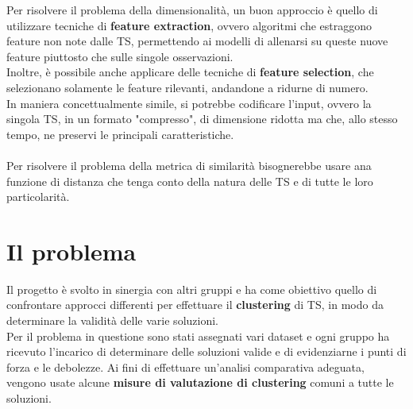 Per risolvere il problema della dimensionalità, un buon approccio è quello di utilizzare tecniche di \textbf{feature extraction}, ovvero algoritmi che estraggono feature non note dalle TS, permettendo ai modelli di allenarsi su queste nuove feature piuttosto che sulle singole osservazioni.\\
Inoltre, è possibile anche applicare delle tecniche di \textbf{feature selection}, che selezionano solamente le feature rilevanti, andandone a ridurne di numero.\\
In maniera concettualmente simile, si potrebbe codificare l'input, ovvero la singola TS, in un formato "compresso", di dimensione ridotta ma che, allo stesso tempo, ne preservi le principali caratteristiche.\\
\\
Per risolvere il problema della metrica di similarità bisognerebbe usare ana funzione di distanza che tenga conto della natura delle TS e di tutte le loro particolarità.\\

\section{Il problema}
Il progetto è svolto in sinergia con altri gruppi e ha come obiettivo quello di confrontare approcci differenti per effettuare il \textbf{clustering} di TS, in modo da determinare la validità delle varie soluzioni.\\
Per il problema in questione sono stati assegnati vari dataset e ogni gruppo ha ricevuto l'incarico di determinare delle soluzioni valide e di evidenziarne i punti di forza e le debolezze. Ai fini di effettuare un'analisi comparativa adeguata, vengono usate alcune \textbf{misure di valutazione di clustering} comuni a tutte le soluzioni.

